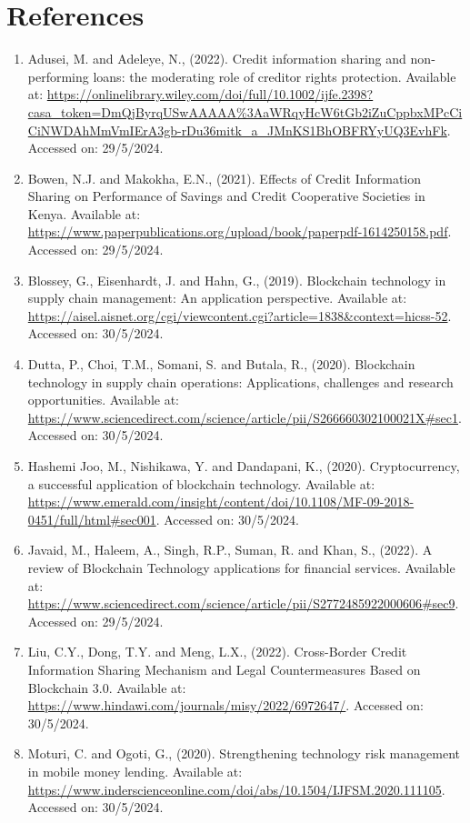 \documentclass[a4paper]{article}
\begin{document}
\section{References}
\begin{enumerate}
    \item Adusei, M. and Adeleye, N., (2022). Credit information sharing and non‐performing loans: the moderating role of creditor rights protection. Available at: \url{https://onlinelibrary.wiley.com/doi/full/10.1002/ijfe.2398?casa_token=DmQjByrqUSwAAAAA\%3AaWRqyHcW6tGb2iZuCppbxMPcCiCiNWDAhMmVmIErA3gb-rDu36mitk_a_JMnKS1BhOBFRYyUQ3EvhFk}. Accessed on: 29/5/2024.
    \item Bowen, N.J. and Makokha, E.N., (2021). Effects of Credit Information Sharing on Performance of Savings and Credit Cooperative Societies in Kenya. Available at: \url{https://www.paperpublications.org/upload/book/paperpdf-1614250158.pdf}. Accessed on: 29/5/2024.
    \item Blossey, G., Eisenhardt, J. and Hahn, G., (2019). Blockchain technology in supply chain management: An application perspective. Available at: \url{https://aisel.aisnet.org/cgi/viewcontent.cgi?article=1838&context=hicss-52}. Accessed on: 30/5/2024.
    \item Dutta, P., Choi, T.M., Somani, S. and Butala, R., (2020). Blockchain technology in supply chain operations: Applications, challenges and research opportunities. Available at: \url{https://www.sciencedirect.com/science/article/pii/S266660302100021X#sec1}. Accessed on: 30/5/2024.
    \item Hashemi Joo, M., Nishikawa, Y. and Dandapani, K., (2020). Cryptocurrency, a successful application of blockchain technology. Available at: \url{https://www.emerald.com/insight/content/doi/10.1108/MF-09-2018-0451/full/html#sec001}. Accessed on: 30/5/2024.
    \item Javaid, M., Haleem, A., Singh, R.P., Suman, R. and Khan, S., (2022). A review of Blockchain Technology applications for financial services. Available at: \url{https://www.sciencedirect.com/science/article/pii/S2772485922000606#sec9}. Accessed on: 29/5/2024.
    \item Liu, C.Y., Dong, T.Y. and Meng, L.X., (2022). Cross-Border Credit Information Sharing Mechanism and Legal Countermeasures Based on Blockchain 3.0. Available at: \url{https://www.hindawi.com/journals/misy/2022/6972647/}. Accessed on: 30/5/2024.
    \item Moturi, C. and Ogoti, G., (2020). Strengthening technology risk management in mobile money lending. Available at: \url{https://www.inderscienceonline.com/doi/abs/10.1504/IJFSM.2020.111105}. Accessed on: 30/5/2024.

\end{enumerate}
\end{document}
